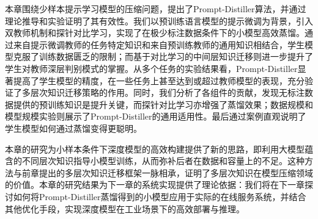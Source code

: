\documentclass[../main.tex]{subfiles}
\begin{document}
\label{sec:3-6}
本章围绕少样本提示学习模型的压缩问题，提出了Prompt-Distiller算法，并通过理论推导和实验证明了其有效性。我们以预训练语言模型的提示微调为背景，引入双教师机制和探针对比学习，实现了在极少标注数据条件下的小模型高效蒸馏。通过来自提示微调教师的任务特定知识和来自预训练教师的通用知识相结合，学生模型克服了训练数据匮乏的限制；而基于对比学习的中间层知识迁移则进一步提升了学生对教师深层判别模式的掌握。从多个任务的实验结果看，Prompt-Distiller显著提高了学生模型的精度，在一些任务上甚至达到或超过教师模型的表现，充分验证了多层次知识迁移策略的作用。同时，我们分析了各组件的贡献，发现无标注数据提供的预训练知识是提升关键，而探针对比学习亦增强了蒸馏效果；数据规模和模型规模实验则展示了Prompt-Distiller的通用适用性。最后通过案例直观说明了学生模型如何通过蒸馏变得更聪明。

本章的研究为小样本条件下深度模型的高效构建提供了新的思路，即利用大模型蕴含的不同层次知识指导小模型训练，从而弥补后者在数据和容量上的不足。这种方法与前章提出的多层次知识迁移框架一脉相承，证明了多层次知识在模型压缩领域的价值。本章的研究结果为下一章的系统实现提供了理论依据：我们将在下一章探讨如何将Prompt-Distiller蒸馏得到的小模型应用于实际的在线服务系统，并结合其他优化手段，实现深度模型在工业场景下的高效部署与推理。
\end{document}
